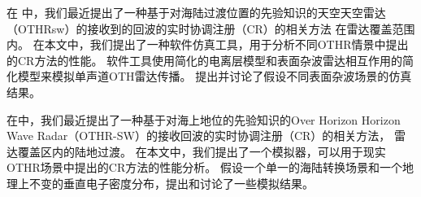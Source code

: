 在 \cite{cuccoli2009over2}中，我们最近提出了一种基于对海陆过渡位置的先验知识的天空天空雷达（OTHRsw）的接收到的回波的实时协调注册（CR）的相关方法 在雷达覆盖范围内。 在本文中，我们提出了一种软件仿真工具，用于分析不同OTHR情景中提出的CR方法的性能。 软件工具使用简化的电离层模型和表面杂波雷达相互作用的简化模型来模拟单声道OTH雷达传播。 提出并讨论了假设不同表面杂波场景的仿真结果。

在\cite{cuccoli2010sea}中，我们最近提出了一种基于对海上地位的先验知识的Over Horizon Horizon Wave Radar（OTHR-SW）的接收回波的实时协调注册（CR）的相关方法， 雷达覆盖区内的陆地过渡。 在本文中，我们提出了一个模拟器，可以用于现实OTHR场景中提出的CR方法的性能分析。 假设一个单一的海陆转换场景和一个地理上不变的垂直电子密度分布，提出和讨论了一些模拟结果。

